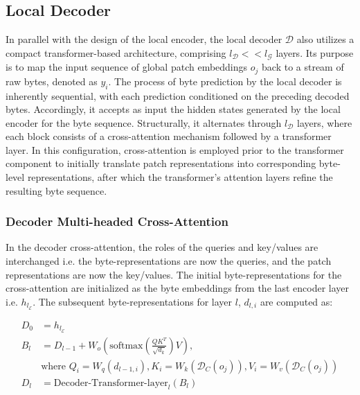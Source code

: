 \subsection{Local Decoder} 

In parallel with the design of the local encoder, the local decoder $\mathcal{D}$ also utilizes a compact transformer-based architecture, comprising $l_{\mathcal{D}} << l_{\mathcal{G}}$ layers. Its purpose is to map the input sequence of global patch embeddings $o_j$ back to a stream of raw bytes, denoted as $y_i$. The process of byte prediction by the local decoder is inherently sequential, with each prediction conditioned on the preceding decoded bytes. Accordingly, it accepts as input the hidden states generated by the local encoder for the byte sequence. Structurally, it alternates through $l_{\mathcal{D}}$ layers, where each block consists of a cross-attention mechanism followed by a transformer layer. In this configuration, cross-attention is employed prior to the transformer component to initially translate patch representations into corresponding byte-level representations, after which the transformer's attention layers refine the resulting byte sequence.

\subsubsection{Decoder Multi-headed Cross-Attention} 

In the decoder cross-attention, the roles of the queries and key/values are interchanged i.e. the byte-representations are now the queries, and the patch representations are now the key/values. The initial byte-representations for the cross-attention are initialized as the byte embeddings from the last encoder layer i.e. $h_{l_{\mathcal{E}}}$. The subsequent byte-representations for layer $l$, $d_{l,i}$ are computed as:

\begin{align}
D_0 &= h_{l_{\mathcal{E}}} \\
B_l &= D_{l-1} + W_o\left(\text{softmax}\left(\frac{QK^T}{\sqrt{d_k}}\right)V\right), \\
  &\text{where } Q_i = W_q(d_{l-1,i}), K_i = W_k(\mathcal{D}_C(o_j)), V_i = W_v(\mathcal{D}_C(o_j)) \\
  D_l &= \text{Decoder-Transformer-layer}_l(B_l)
\end{align}

